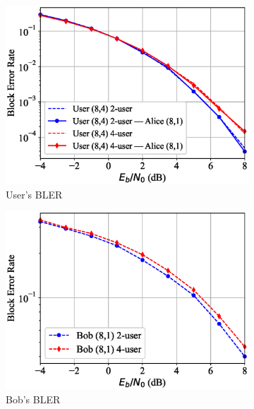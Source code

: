 \begin{figure}[tp!]
	\begin{subfigure}{0.28\textwidth}
		\includegraphics[width=\linewidth]{figs/multi_covert_autoencoder_bler_awgn}
		\caption{User's BLER}
		\label{fig:multi_awgn_results_ae}
	\end{subfigure}
	\hspace*{\fill}
	\begin{subfigure}{0.28\textwidth}
		\includegraphics[width=\linewidth]{figs/multi_bob_bler_awgn}
		\caption{Bob's BLER}	
		\label{fig:multi_awgn_results_bob}
	\end{subfigure}
	\hspace*{\fill}
	\begin{subfigure}{0.28\textwidth}

\end{subfigure}
\end{figure}
